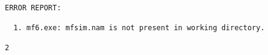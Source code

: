 {\small
\begin{lstlisting}[style=modeloutput]

ERROR REPORT:

  1. mf6.exe: mfsim.nam is not present in working directory.

2

\end{lstlisting}
}
